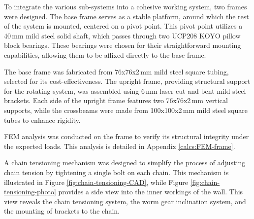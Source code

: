 To integrate the various sub-systems into a cohesive working system, two frames were designed. The base frame serves as a stable platform, around which the rest of the system is mounted, centered on a pivot point. This pivot point utilizes a 40\,mm mild steel solid shaft, which passes through two UCP208 KOYO pillow block bearings. These bearings were chosen for their straightforward mounting capabilities, allowing them to be affixed directly to the base frame.

The base frame was fabricated from 76x76x2\,mm mild steel square tubing, selected for its cost-effectiveness. The upright frame, providing structural support for the rotating system, was assembled using 6\,mm laser-cut and bent mild steel brackets. Each side of the upright frame features two 76x76x2\,mm vertical supports, while the crossbeams were made from 100x100x2\,mm mild steel square tubes to enhance rigidity.

FEM analysis was conducted on the frame to verify its structural integrity under the expected loads. This analysis is detailed in Appendix \ref{calcs:FEM-frame}.

A chain tensioning mechanism was designed to simplify the process of adjusting chain tension by tightening a single bolt on each chain. This mechanism is illustrated in Figure \ref{fig:chain-tensioning-CAD}, while Figure \ref{fig:chain-tensioning-photo} provides a side view into the inner workings of the wall. This view reveals the chain tensioning system, the worm gear inclination system, and the mounting of brackets to the chain.

